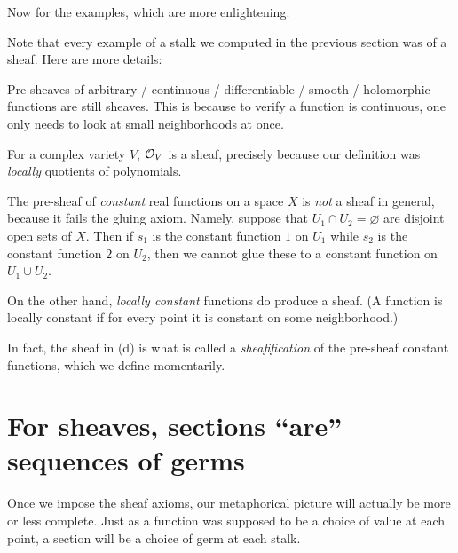 Now for the examples, which are more enlightening:
\begin{example}
	Note that every example of a stalk we computed
	in the previous section was of a sheaf.
	Here are more details:
	\begin{enumerate}[(a)]
		\ii Pre-sheaves of arbitrary / continuous / differentiable / smooth
		/ holomorphic functions are still sheaves.
		This is because to verify a function is continuous,
		one only needs to look at small neighborhoods at once.
		
		\ii For a complex variety $V$, $\mathcal O_V$ is a sheaf,
		precisely because our definition was \emph{locally} quotients
		of polynomials.

		\ii The pre-sheaf of \emph{constant} real functions on a space $X$
		is \emph{not} a sheaf in general, because it fails the gluing axiom.
		Namely, suppose that $U_1 \cap U_2 = \varnothing$
		are disjoint open sets of $X$.
		Then if $s_1$ is the constant function $1$ on $U_1$
		while $s_2$ is the constant function $2$ on $U_2$,
		then we cannot glue these to a constant function on $U_1 \cup U_2$.

		\ii On the other hand, \emph{locally constant} functions
		do produce a sheaf. (A function is locally constant
		if for every point it is constant on some neighborhood.)
	\end{enumerate}
	In fact, the sheaf in (d) is what is called a \emph{sheafification}
	of the pre-sheaf constant functions, which we define momentarily.
\end{example}

\section{For sheaves, sections ``are'' sequences of germs}

Once we impose the sheaf axioms,
our metaphorical picture will actually be more or less complete.
Just as a function was supposed to be a choice of value at each point,
a section will be a choice of germ at each stalk.

